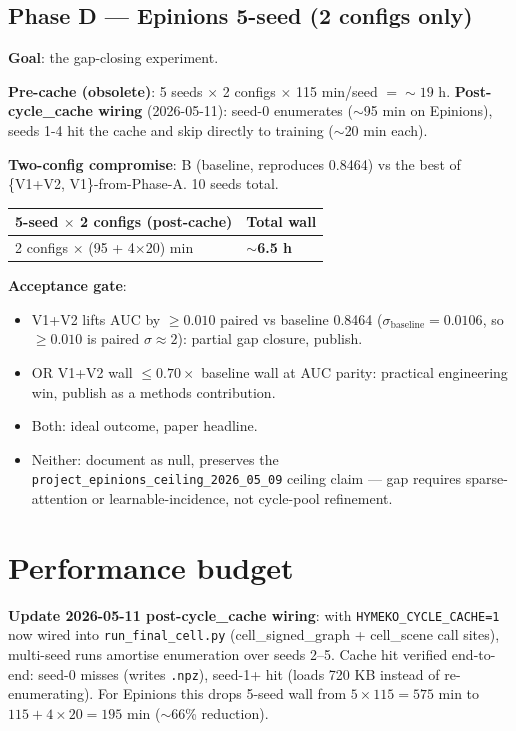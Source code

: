 \documentclass[11pt,a4paper]{article}
\begin{document}
\subsection*{Phase D --- Epinions 5-seed (2 configs only)}
\textbf{Goal}: the gap-closing experiment.

\textbf{Pre-cache (obsolete)}: 5 seeds $\times$ 2 configs $\times$ 115
min/seed $= \sim 19$ h.  \textbf{Post-cycle\_cache wiring} (2026-05-11):
seed-0 enumerates ($\sim$95 min on Epinions), seeds 1-4 hit the cache
and skip directly to training ($\sim$20 min each).

\textbf{Two-config compromise}: B (baseline, reproduces 0.8464) vs
the best of \{V1+V2, V1\}-from-Phase-A.  10 seeds total.

\begin{tabular}{ll}
\toprule
5-seed $\times$ 2 configs (post-cache) & Total wall \\
\midrule
2 configs $\times$ (95 + 4$\times$20) min & $\sim$\textbf{6.5 h} \\
\bottomrule
\end{tabular}

\textbf{Acceptance gate}:
\begin{itemize}
\item V1+V2 lifts AUC by $\ge 0.010$ paired vs baseline 0.8464
  ($\sigma_{\text{baseline}} = 0.0106$, so $\ge 0.010$ is paired
  $\sigma \approx 2$): partial gap closure, publish.
\item OR V1+V2 wall $\le 0.70 \times$ baseline wall at AUC parity:
  practical engineering win, publish as a methods contribution.
\item Both: ideal outcome, paper headline.
\item Neither: document as null, preserves the
  \texttt{project\_epinions\_ceiling\_2026\_05\_09} ceiling claim
  --- gap requires sparse-attention or learnable-incidence, not
  cycle-pool refinement.
\end{itemize}

\section{Performance budget}

\textbf{Update 2026-05-11 post-cycle\_cache wiring}: with
\texttt{HYMEKO\_CYCLE\_CACHE=1} now wired into
\texttt{run\_final\_cell.py} (cell\_signed\_graph + cell\_scene call
sites), multi-seed runs amortise enumeration over seeds 2--5.  Cache
hit verified end-to-end: seed-0 misses (writes \texttt{.npz}),
seed-1+ hit (loads 720 KB instead of re-enumerating).  For Epinions
this drops 5-seed wall from $5\times 115 = 575$ min to
$115 + 4\times 20 = 195$ min ($\sim$66\% reduction).
\end{document}
